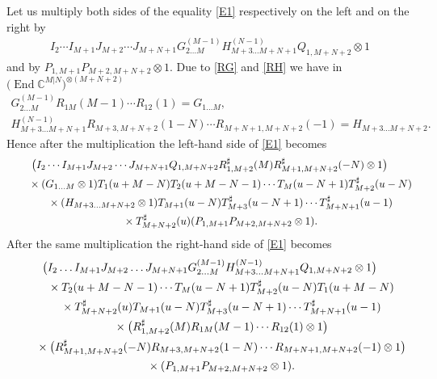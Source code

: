 \documentclass[pdftex]{sigma}
\numberwithin{equation}{section}
\def\CC{{\mathbb{C}}}
\def\CMN{\CC^{M|N}}
\def\End{\operatorname{End}}
\def\ot{\otimes}
\def\RS{R^{\sharp}}
\def\TS{T^{\sharp}}
\begin{document}
Let us multiply both sides of the equality \eqref{E1}
respectively on the left and on the right by
\begin{gather*}
I_{2} \cdots I_{M+1}
J_{M+2} \cdots J_{M+N+1}
G_{2 \dots M}^{(M-1)} H_{M+3 \dots M+N+1}^{(N-1)}
Q_{1,M+N+2}\ot1
\end{gather*}
and by $P_{1,M+1} P_{M+2,M+N+2}\ot1 $.
Due to \eqref{RG} and \eqref{RH} we have in~$\big(\End\CMN\big)^{\ot (M+N+2)}$
\begin{gather}\label{GM}
 G_{2 \dots M}^{(M-1)} R_{1M} (M-1) \cdots R_{12} (1)=G_{1 \dots M} ,\\
\label{HN}
H_{M+3 \dots M+N+1}^{(N-1)}R_{M+3,M+N+2} (1-N) \cdots R_{M+N+1,M+N+2} (-1)= H_{M+3 \dots M+N+2} .
\end{gather}
Hence after the multiplication the left-hand side of \eqref{E1} becomes
\begin{gather}
\big( I_{2} \cdots I_{M+1}
J_{M+2} \cdots J_{M+N+1} Q_{1,M+N+2}
\RS_{1,M+2} (M )
\RS_{M+1,M+N+2} (-N )\ot1 \big)\notag\\
\qquad{}\times
( G_{1 \dots M}\ot1 )
T_1 (u+M-N) T_2 (u+M-N-1) \cdots T_{M} (u-N+1)
\TS_{M+2} (u-N)\notag
\\ \qquad{} \times
( H_{M+3 \dots M+N+2}\ot1 )
T_{M+1} (u-N)
\TS_{M+3} (u-N+1) \cdots \TS_{M+N+1} (u-1)\notag
\\ \qquad{} \times
\TS_{M+N+2} (u) ( P_{1,M+1} P_{M+2,M+N+2}\ot1 ) .\label{E2}
\end{gather}
After the same multiplication the right-hand side of \eqref{E1} becomes
\begin{gather}
 \big( I_{2} \dots I_{M+1}
J_{M+2} \dots J_{M+N+1}
G_{2 \dots M}^{(M-1)} H_{M+3 \dots M+N+1}^{(N-1)}
Q_{1,M+N+2}\ot1 \big)\notag
\\
\qquad{} \times T_2 (u+M-N-1) \cdots T_{M} (u-N+1)
\TS_{M+2} (u-N) T_1 (u+M-N)\notag
\\ \qquad{} \times \TS_{M+N+2} (u) T_{M+1} (u-N)
\TS_{M+3} (u-N+1) \cdots \TS_{M+N+1} (u-1)\notag\\
\qquad{} \times
\big( \RS_{1,M+2} (M )
R_{1M} (M-1) \cdots R_{12} (1)\ot1 \big)\notag
\\ \qquad{} \times
 \big( \RS_{M+1,M+N+2} (-N )
R_{M+3,M+N+2} (1-N) \cdots R_{M+N+1,M+N+2} (-1)\ot1 \big)\notag
\\ \qquad{} \times
( P_{1,M+1} P_{M+2,M+N+2}\ot1 ) . \label{E4}
\end{gather}
\end{document}
